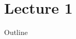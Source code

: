 \documentclass{beamer}
\begin{document}

\part{Lecture 1}

\begin{frame}
	\titlepage
	\resetonslide
\end{frame}
\begin{frame}{Outline}
	\tableofcontents[part=1]
\end{frame}
\end{document}
